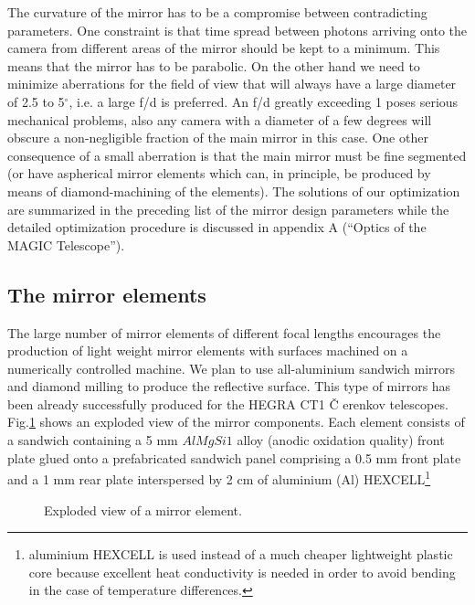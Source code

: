 \medskip The curvature of the mirror has to be a compromise between
contradicting parameters. One constraint is that time spread between photons
arriving onto the camera from different areas of the mirror should be kept
to a minimum. This means that the mirror has to be parabolic. On the other
hand we need to minimize aberrations for the field of view that will always
have a large diameter of 2.5 to 5$^{\circ }$, i.e. a large f/d is preferred. An
f/d greatly exceeding 1 poses serious mechanical problems, also any camera
with a diameter of a few degrees will obscure a non-negligible fraction of
the main mirror in this case. One other consequence of a small aberration is
that the main mirror must be fine segmented (or have aspherical mirror
elements which can, in principle, be produced by means of diamond-machining
of the elements). The solutions of our optimization are summarized in the
preceding list of the mirror design parameters while the detailed
optimization procedure is discussed in appendix A (``Optics of the MAGIC Telescope'').

\subsection{The mirror elements}


\medskip The large number of mirror elements of different focal lengths
encourages the production of light weight mirror elements with surfaces
machined on a numerically controlled machine. We plan to use all-aluminium
sandwich mirrors and diamond milling to produce the reflective surface. This
type of mirrors has been already successfully produced for the HEGRA CT1 \v{C}%
erenkov telescopes. Fig.\ref{fig-mirror} shows an exploded view of the
mirror components. Each element consists of a sandwich containing a 5 mm $%
AlMgSi1$ alloy (anodic oxidation quality) front plate glued onto a
prefabricated sandwich panel comprising a 0.5 mm front plate and a 1 mm rear
plate interspersed by 2 cm of aluminium (Al) HEXCELL\footnote{%
aluminium HEXCELL is used instead of a much cheaper lightweight plastic core
because excellent heat conductivity is needed in order to avoid bending in
the case of temperature differences.}

\begin{figure}[htb]
\begin{center}
\caption{Exploded view of a mirror element.}
\label{fig-mirror}
\end{center}
\end{figure}


